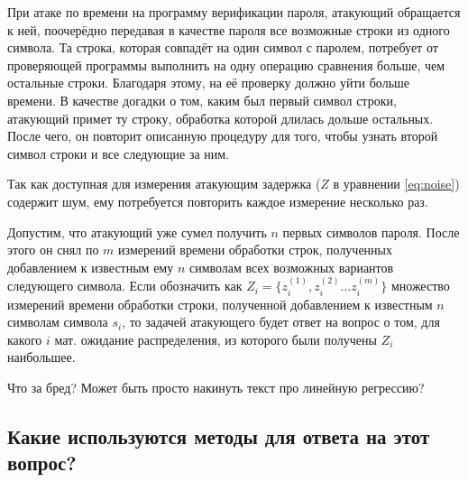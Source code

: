 При атаке по времени на программу верификации пароля, атакующий обращается к
ней, поочерёдно передавая в качестве пароля все возможные строки из одного
символа. Та строка, которая совпадёт на один символ с паролем, потребует от
проверяющей программы выполнить на одну операцию сравнения больше, чем остальные
строки. Благодаря этому, на её проверку должно уйти больше времени. В качестве
догадки о том, каким был первый символ строки, атакующий примет ту строку,
обработка которой длилась дольше остальных. После чего, он повторит описанную
процедуру для того, чтобы узнать второй символ строки и все следующие за ним.

Так как доступная для измерения атакующим задержка ($Z$ в уравнении
\ref{eq:noise}) содержит шум, ему потребуется повторить каждое измерение
несколько раз.

Допустим, что атакующий уже сумел получить $n$ первых символов пароля. После
этого он снял по $m$ измерений времени обработки строк, полученных добавлением
к известным ему $n$ символам всех возможных вариантов следующего символа. Если
обозначить как $Z_i = \{ z_i^{(1)}, z_i^{(2)} ... z_i^{(m)} \}$ множество
измерений времени обработки строки, полученной добавлением к известным $n$
символам символа $s_i$, то задачей атакующего будет ответ на вопрос о том,
для какого $i$ мат. ожидание распределения, из которого были получены $Z_i$
наибольшее.

Что за бред? Может быть просто накинуть текст про линейную регрессию?

\subsection{Какие используются методы для ответа на этот вопрос?}

\clearpage
